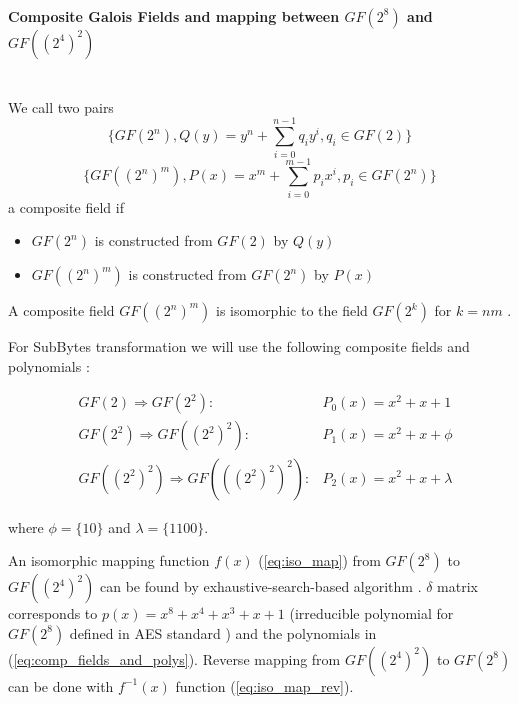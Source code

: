 \paragraph{Composite Galois Fields and mapping between $GF(2^8)$ and $GF((2^4)^2)$}\mbox{}\\
We call two pairs
\begin{equation*}
\{GF(2^n), Q(y) = y^n + \sum_{i=0}^{n-1} q_i y^i, q_i \in GF(2) \}
\end{equation*}
\begin{equation*}
\{GF((2^n)^m), P(x) = x^m + \sum_{i=0}^{m-1} p_i x^i, p_i \in GF(2^n) \}
\end{equation*}
a composite field \cite{vlsi} if 
\begin{itemize}[nolistsep]
\item $GF(2^n)$ is constructed from $GF(2)$ by $Q(y)$
\item $GF((2^n)^m)$ is constructed from $GF(2^n)$ by $P(x)$
\end{itemize}
A composite field $GF((2^n)^m)$ is isomorphic to the field $GF(2^k)$ for $k = nm$ \cite{vlsi}.

For SubBytes transformation we will use the following composite fields and polynomials \cite{vlsi}:

\begin{equation}
\begin{aligned}
\label{eq:comp_fields_and_polys}
&GF(2) \Rightarrow GF(2^2) :               & P_0(x) = x^2 + x + 1\\
&GF(2^2) \Rightarrow GF((2^2)^2) :         & P_1(x) = x^2 + x + \phi\\
&GF((2^2)^2) \Rightarrow GF(((2^2)^2)^2) : & P_2(x) = x^2 + x + \lambda
\end{aligned}
\end{equation}

where $\phi = \{10\}$ and $\lambda = \{1100\}$.

An isomorphic mapping function $f(x)$ (\ref{eq:iso_map}) from $GF(2^8)$ to $GF((2^4)^2)$ can be found by exhaustive-search-based algorithm \cite{vlsi}. $\delta$ matrix corresponds to $p(x) = x^8 + x^4 + x^3 + x + 1$ (irreducible polynomial for $GF(2^8)$ defined in AES standard \cite{aes-standard}) and the polynomials in (\ref{eq:comp_fields_and_polys}). Reverse mapping from $GF((2^4)^2)$ to $GF(2^8)$ can be done with $f^{-1}(x)$ function (\ref{eq:iso_map_rev}).


